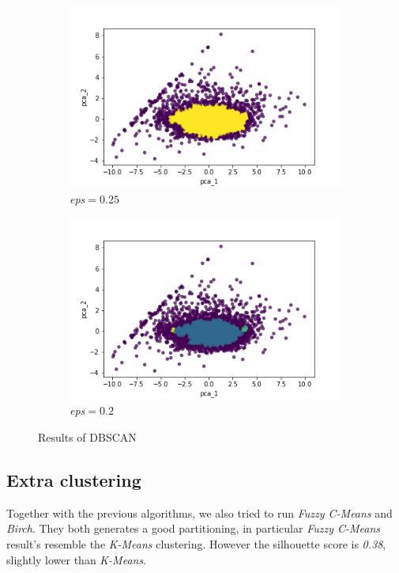 \begin{figure}[h!]
	\captionsetup{justification=centering}
	\centering
	\begin{subfigure}{0.49\textwidth}
		\includegraphics[width=.65\textwidth]{img/clustering/dbscan.png}
		\centering
		\caption{\emph{eps}$ = 0.25$}
		\label{fig:dbscan_good}
	\end{subfigure}
	\begin{subfigure}{0.49\textwidth}
		\includegraphics[width=.65\textwidth]{img/clustering/dbscan_bad.png}
		\centering
		\caption{\emph{eps}$ = 0.2$}
		\label{fig:dbscan_bad}
	\end{subfigure}
	\caption{Results of DBSCAN}
	\label{fig:dbscan}
\end{figure}

\subsection{Extra clustering}

Together with the previous algorithms, we also tried to run \emph{Fuzzy C-Means} and \emph{Birch}. They both generates a good partitioning, in particular \emph{Fuzzy C-Means} result's resemble the \emph{K-Means} clustering. However the silhouette score is \emph{0.38}, slightly lower than \emph{K-Means}.

